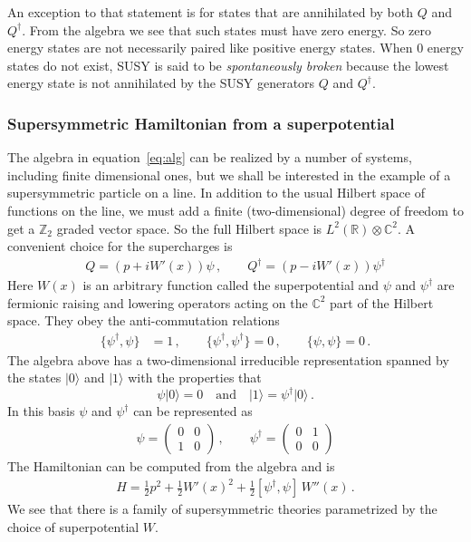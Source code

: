 \documentclass[a4paper,11pt]{article}
\def\be{\begin{equation}}
\def\ee{\end{equation}}
\numberwithin{equation}{section}
\begin{document}
An exception to that statement is for states that are annihilated by both $Q$ and $Q^\dagger$. From the algebra we see that such states must have zero energy. So zero energy states are not necessarily paired like positive energy states. When 0 energy states do not exist, SUSY is said to be \textit{spontaneously broken} because the lowest energy state is not annihilated by the SUSY generators $Q$ and $Q^\dagger$.

\subsubsection*{Supersymmetric Hamiltonian from a superpotential}

The algebra in equation~\eqref{eq:alg} can be realized by a number of systems, including finite dimensional ones, but we shall be interested in the example of a supersymmetric particle on a line. In addition to the usual Hilbert space of functions on the line, we must add a finite (two-dimensional) degree of freedom to get a $\mathbb{Z}_2$ graded vector space. So the full Hilbert space is $L^2(\mathbb{R}) \otimes \mathbb{C}^2$. A convenient choice for the supercharges is 
%
\begin{align}
    Q = (p + i W'(x)) \psi \, ,\qquad Q^\dagger  = (p - i W'(x) ) \psi^\dagger
\end{align}
%
Here $W(x)$ is an arbitrary function called the superpotential and $\psi$ and $\psi^\dagger$ are fermionic raising and lowering operators acting on the $\mathbb{C}^2$ part of the Hilbert space. They obey the anti-commutation relations 
\begin{align}
	\{\psi^\dagger , \psi \} & = 1 \, ,\qquad 
	\{\psi^\dagger , \psi^\dagger \}  = 0 \, , \qquad 
	\{\psi , \psi \}  = 0 \, .
\end{align}
The algebra above has a two-dimensional irreducible representation spanned by the states $|0 \rangle$ and $| 1 \rangle$ with the properties that
\be
\psi | 0 \rangle = 0 \quad \text{and} \quad |1 \rangle = \psi^\dagger |0 \rangle \, .
\ee
%
In this basis $\psi$ and $\psi^\dagger$ can be represented as
%
\begin{align}
    \psi = \begin{pmatrix}
        0 & 0 \\ 1 & 0
    \end{pmatrix} \, , \qquad \psi^\dagger = \begin{pmatrix}
        0 & 1 \\ 0 & 0
    \end{pmatrix} 
\end{align}
%
The Hamiltonian can be computed from the algebra and is 
%
\begin{align}
    H = \frac{1}{2} p^2 + \frac{1}{2} W'(x)^2 + \frac{1}{2} [\psi^\dagger, \psi] \,  W''(x) \, .
\end{align}
%
We see that there is a family of supersymmetric theories parametrized by the choice of superpotential $W$.
\end{document}
